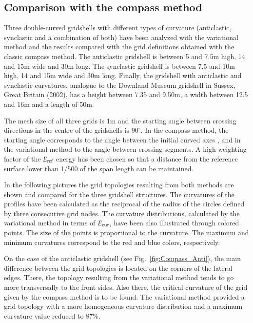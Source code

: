 \documentclass[Thesis.tex]{subfiles}
\begin{document}
\subsection{Comparison with the compass method}
Three double-curved gridshells with different types of curvature (anticlastic, synclastic and a combination of both) have been analyzed with the variational method and the results compared with the grid definitions obtained with the classic compass method. The anticlastic gridshell is between 5 and 7.5m high, 14 and 15m wide and 30m long. The synclastic gridshell is between 7.5 and 10m high, 14 and 15m wide and 30m long. Finally, the gridshell with anticlastic and synclastic curvatures, analogue to the Downland Museum gridshell in Sussex, Great Britain (2002), has a height between 7.35 and 9.50m, a width between 12.5 and 16m and a length of 50m. 

The mesh size of all three grids is 1m and the starting angle between crossing directions in the centre of the gridshells is $90^\circ$. In the compass method, the starting angle corresponds to the angle between the initial curved axes \cite{IL1974}, and in the variational method to the angle between crossing segments. A high weighting factor of the $E_{\textrm{\scriptsize{ref}}}$ energy has been chosen so that a distance from the reference surface lower than 1/500 of the span length can be maintained.

In the following pictures the grid topologies resulting from both methods are shown and compared for the three gridshell structures. The curvatures of the profiles have been calculated as the reciprocal of the radius of the circles defined by three consecutive grid nodes. The curvature distributions, calculated by the variational method in terms of $E_{\textrm{\scriptsize{cur}}}$, have been also illustrated through colored points. The size of the points is proportional to the curvature. The maximum and minimum curvatures correspond to the red and blue colors, respectively.

On the case of the anticlastic gridshell (see Fig.~\ref{fig:Compass_Anti}), the main difference between the grid topologies is located on the corners of the lateral edges. There, the topology resulting from the variational method tends to go more transversally to the front sides. Also there, the critical curvature of the grid given by the compass method is to be found. The variational method provided a grid topology with a more homogeneous curvature distribution and a maximum curvature value reduced to 87\%.
\end{document}
